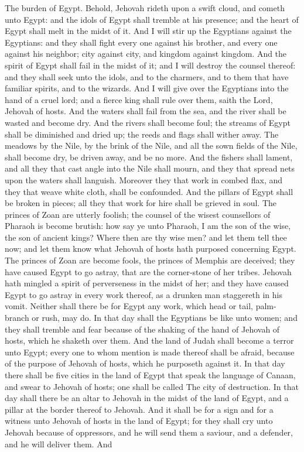 The burden of Egypt. Behold, Jehovah rideth upon a swift cloud, and cometh unto Egypt: and the idols of Egypt shall tremble at his presence; and the heart of Egypt shall melt in the midst of it. And I will stir up the Egyptians against the Egyptians: and they shall fight every one against his brother, and every one against his neighbor; city against city, and kingdom against kingdom. And the spirit of Egypt shall fail in the midst of it; and I will destroy the counsel thereof: and they shall seek unto the idols, and to the charmers, and to them that have familiar spirits, and to the wizards. And I will give over the Egyptians into the hand of a cruel lord; and a fierce king shall rule over them, saith the Lord, Jehovah of hosts.  And the waters shall fail from the sea, and the river shall be wasted and become dry. And the rivers shall become foul; the streams of Egypt shall be diminished and dried up; the reeds and flags shall wither away. The meadows by the Nile, by the brink of the Nile, and all the sown fields of the Nile, shall become dry, be driven away, and be no more. And the fishers shall lament, and all they that cast angle into the Nile shall mourn, and they that spread nets upon the waters shall languish. Moreover they that work in combed flax, and they that weave white cloth, shall be confounded. And the pillars of Egypt shall be broken in pieces; all they that work for hire shall be grieved in soul.  The princes of Zoan are utterly foolish; the counsel of the wisest counsellors of Pharaoh is become brutish: how say ye unto Pharaoh, I am the son of the wise, the son of ancient kings? Where then are thy wise men? and let them tell thee now; and let them know what Jehovah of hosts hath purposed concerning Egypt. The princes of Zoan are become fools, the princes of Memphis are deceived; they have caused Egypt to go astray, that are the corner-stone of her tribes. Jehovah hath mingled a spirit of perverseness in the midst of her; and they have caused Egypt to go astray in every work thereof, as a drunken man staggereth in his vomit. Neither shall there be for Egypt any work, which head or tail, palm-branch or rush, may do.  In that day shall the Egyptians be like unto women; and they shall tremble and fear because of the shaking of the hand of Jehovah of hosts, which he shaketh over them. And the land of Judah shall become a terror unto Egypt; every one to whom mention is made thereof shall be afraid, because of the purpose of Jehovah of hosts, which he purposeth against it.  In that day there shall be five cities in the land of Egypt that speak the language of Canaan, and swear to Jehovah of hosts; one shall be called The city of destruction.  In that day shall there be an altar to Jehovah in the midst of the land of Egypt, and a pillar at the border thereof to Jehovah. And it shall be for a sign and for a witness unto Jehovah of hosts in the land of Egypt; for they shall cry unto Jehovah because of oppressors, and he will send them a saviour, and a defender, and he will deliver them. And 